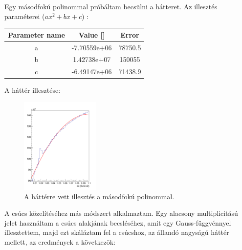 \documentclass[a4paper,12pt]{article}
\begin{document}
\par Egy másodfokú polinommal próbáltam becsülni a hátteret. Az illesztés paraméterei ($ax^{2} + bx +c$) :
\begin{center}
	\begin{tabular}{|c|c|c|}
		\hline
		Parameter name & Value []     & Error   \\
		\hline
		a              & -7.70559e+06 & 78750.5 \\
		\hline
		b              & 1.42738e+07  & 150055  \\
		\hline
		c              & -6.49147e+06 & 71438.9 \\
		\hline
	\end{tabular}
\end{center}
\par A háttér illesztése: 
\begin{figure}[H]
	\centering
	\includegraphics[width=0.35\textwidth]{combiback_fit.png}
	\caption{ A háttérre vett illesztés a másodfokú polinommal. }
\end{figure}
\par A csúcs közelítéséhez más módszert alkalmaztam. Egy alacsony multiplicitású jelet használtam a csúcs alakjának becsléséhez, amit egy
Gauss-függvénnyel illesztettem, majd ezt skáláztam fel a csúcshoz, az állandó nagyságú háttér mellett, az eredmények a következők:
\end{document}
